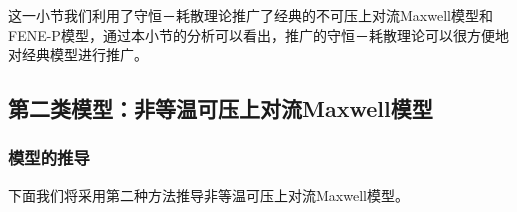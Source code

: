 	这一小节我们利用了守恒－耗散理论推广了经典的不可压上对流Maxwell模型和FENE-P模型，通过本小节的分析可以看出，推广的守恒－耗散理论可以很方便地对经典模型进行推广。

	\subsection{第二类模型：非等温可压上对流Maxwell模型}
	\subsubsection{模型的推导}
	下面我们将采用第二种方法推导非等温可压上对流Maxwell模型。

